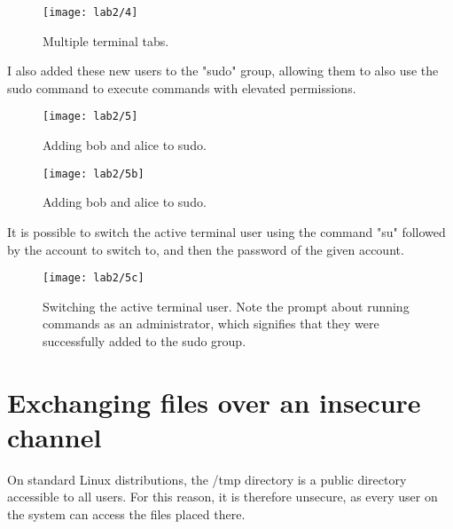 \begin{figure}[H]
    \centering
    \texttt{[image: lab2/4]}
    \caption{Multiple terminal tabs.}
    \label{fig:terminalTabs}
\end{figure}

I also added these new users to the "sudo" group, allowing them to also use the sudo command to execute commands
with elevated permissions.

\begin{figure}[H]
    \centering
    \texttt{[image: lab2/5]}
    \caption{Adding bob and alice to sudo.}
    \label{fig:sudoAdd1}
\end{figure}

\begin{figure}[H]
    \centering
    \texttt{[image: lab2/5b]}
    \caption{Adding bob and alice to sudo.}
    \label{fig:sudoAdd2}
\end{figure}

It is possible to switch the active terminal user using the command "su" followed by the account to switch to,
and then the password of the given account.

\begin{figure}[H]
    \centering
    \texttt{[image: lab2/5c]}
    \caption{Switching the active terminal user. Note the prompt about running commands as an administrator,
    which signifies that they were successfully added to the sudo group.}
    \label{fig:suBobAlice}
\end{figure}

\pagebreak

\section{Exchanging files over an insecure channel}\label{sec:tmpExchange}
On standard Linux distributions, the /tmp directory is a public directory accessible to all users.
For this reason, it is therefore unsecure, as every user on the system can access the files placed there.


